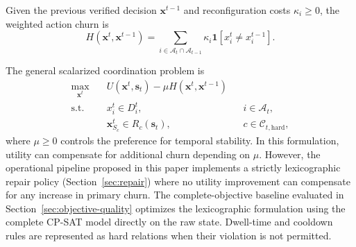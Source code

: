 \documentclass[pdflatex,sn-mathphys-num,iicol,oneside]{sn-jnl}
\newcommand{\cpsat}{\textsc{CP-SAT}\xspace}
\begin{document}
Given the previous verified decision $\bm{x}^{t-1}$ and
reconfiguration costs $\kappa_i\geq 0$, the weighted action churn is
\begin{equation}
H(\bm{x}^{t},\bm{x}^{t-1})
=
\sum_{i\in\mathcal{A}_t\cap\mathcal{A}_{t-1}}
\kappa_i
\mathbf{1}
\left[
x_i^t\neq x_i^{t-1}
\right].
\label{eq:churn}
\end{equation}

The general scalarized coordination problem is
\begin{align}
\max_{\bm{x}^{t}}\quad&
U(\bm{x}^{t},\bm{s}_t)
-
\mu H(\bm{x}^{t},\bm{x}^{t-1})
\label{eq:problem-objective}\\
\text{s.t.}\quad&
x_i^t\in D_i^t,
&& i\in\mathcal{A}_t,
\nonumber\\
&
\bm{x}_{S_c}^t\in R_c(\bm{s}_t),
&& c\in\mathcal{C}_{t,\mathrm{hard}},
\label{eq:problem-hard}
\end{align}
where $\mu\geq 0$ controls the preference for temporal stability. In this formulation, utility can compensate for additional churn depending on $\mu$.
However, the operational pipeline proposed in this paper implements a strictly lexicographic repair policy (Section~\ref{sec:repair}) where no utility improvement can compensate for any increase in primary churn. The complete-objective baseline evaluated in Section~\ref{sec:objective-quality} optimizes the lexicographic formulation
using the complete \cpsat model directly on the raw state. Dwell-time and cooldown rules are represented as hard relations when
their violation is not permitted.
\end{document}
